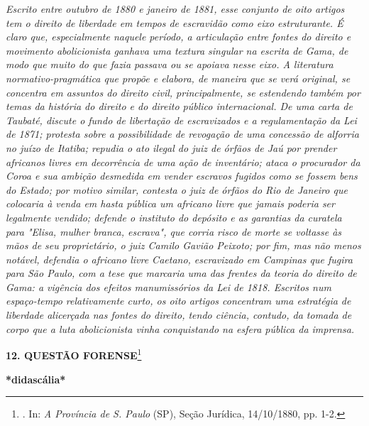 \emph{Escrito entre outubro de 1880 e janeiro de 1881, esse conjunto de
oito artigos tem o direito de liberdade em tempos de escravidão como
eixo estruturante. É claro que, especialmente naquele período, a
articulação entre fontes do direito e movimento abolicionista ganhava
uma textura singular na escrita de Gama, de modo que muito do que fazia
passava ou se apoiava nesse eixo. A literatura normativo-pragmática que
propõe e elabora, de maneira que se verá original, se concentra em
assuntos do direito civil, principalmente, se estendendo também por
temas da história do direito e do direito público internacional. De uma
carta de Taubaté, discute o fundo de libertação de escravizados e a
regulamentação da Lei de 1871; protesta sobre a possibilidade de
revogação de uma concessão de alforria no juízo de Itatiba; repudia o
ato ilegal do juiz de órfãos de Jaú por prender africanos livres em
decorrência de uma ação de inventário; ataca o procurador da Coroa e sua
ambição desmedida em vender escravos fugidos como se fossem bens do
Estado; por motivo similar, contesta o juiz de órfãos do Rio de Janeiro
que colocaria à venda em hasta pública um africano livre que jamais
poderia ser legalmente vendido; defende o instituto do depósito e as
garantias da curatela para "Elisa, mulher branca, escrava", que corria
risco de morte se voltasse às mãos de seu proprietário, o juiz Camilo
Gavião Peixoto; por fim, mas não menos notável, defendia o africano
livre Caetano, escravizado em Campinas que fugira para São Paulo, com a
tese que marcaria uma das frentes da teoria do direito de Gama: a
vigência dos efeitos manumissórios da Lei de 1818. Escritos num
espaço-tempo relativamente curto, os oito artigos concentram uma
estratégia de liberdade alicerçada nas fontes do direito, tendo ciência,
contudo, da tomada de corpo que a luta abolicionista vinha conquistando
na esfera pública da imprensa.}

\textbf{12. QUESTÃO FORENSE}\footnote{. In: \emph{A Província de S.
  Paulo} (SP), Seção Jurídica, 14/10/1880, pp. 1-2.}

\textbf{*didascália*}

